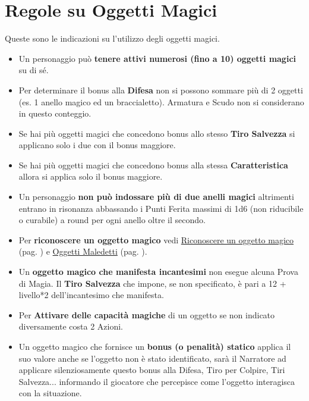 \section{Regole su Oggetti Magici}\hypertarget{identificareom}{}\label{regoleoggettimagici}\hypertarget{regoleoggettimagici}{}

\begin{multicols}{2}

Queste sono le indicazioni su l'utilizzo degli oggetti magici.

\label{oggetti-magici}
\begin{itemize}[leftmargin=*] \setlength{\itemsep}{0pt}
\item
Un personaggio può \textbf{tenere attivi numerosi (fino a 10) oggetti magici} su di sé.

\item Per determinare il bonus alla \textbf{Difesa} non si possono sommare più di 2 oggetti (es. 1 anello magico ed un braccialetto). Armatura e Scudo non si considerano in questo conteggio.
\item
Se hai più oggetti magici che concedono bonus allo stesso \textbf{Tiro Salvezza} si applicano solo i due con il bonus maggiore.
\item
Se hai più oggetti magici che concedono bonus alla stessa \textbf{Caratteristica} allora si applica solo il bonus maggiore.
\item
Un personaggio \textbf{non può indossare più di due anelli magici} altrimenti entrano in risonanza abbassando i Punti Ferita massimi di 1d6 (non riducibile o curabile) a round per ogni anello oltre il secondo.
\item
Per \textbf{riconoscere un oggetto magico} vedi \hyperlink{rinoscereoggettomagico}{Riconoscere un oggetto magico} (pag. \pageref{rinoscereoggettomagico}) e \hyperlink{oggettimaledettiid}{Oggetti Maledetti} (pag. \pageref{oggettimaledettiid}).
\item
Un \textbf{oggetto magico che manifesta incantesimi} non esegue alcuna Prova di Magia. Il \textbf{Tiro Salvezza} che impone, se non specificato, è pari a 12 + livello*2 dell'incantesimo che manifesta.\label{tirosalvezzaincoggetto}
\item
Per \textbf{Attivare delle capacità magiche} di un oggetto se non indicato diversamente  costa 2 Azioni.
\item
Un oggetto magico che fornisce un \textbf{bonus (o penalità) statico} applica il suo valore anche se l'oggetto non è stato identificato, sarà il Narratore ad applicare silenziosamente questo bonus alla Difesa, Tiro per Colpire, Tiri Salvezza... informando il giocatore che percepisce come l'oggetto interagisca con la situazione.

\end{itemize}
\end{multicols}
